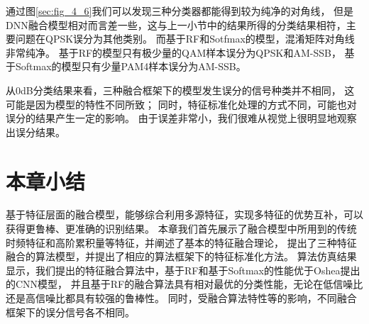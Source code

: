 通过图\ref{sec:fig_4_6}我们可以发现三种分类器都能得到较为纯净的对角线，
但是DNN融合模型相对而言差一些，这与上一小节中的结果所得的分类结果相符，主要问题在QPSK误分为其他类别。
而基于RF和Sotfmax的模型，混淆矩阵对角线非常纯净。
基于RF的模型只有极少量的QAM样本误分为QPSK和AM-SSB，
基于Softmax的模型只有少量PAM4样本误分为AM-SSB。\par

从0dB分类结果来看，三种融合框架下的模型发生误分的信号种类并不相同，
这可能是因为模型的特性不同所致；
同时，特征标准化处理的方式不同，可能也对误分的结果产生一定的影响。
由于误差非常小，我们很难从视觉上很明显地观察出误分结果。

\section{本章小结}
基于特征层面的融合模型，能够综合利用多源特征，实现多特征的优势互补，可以获得更鲁棒、更准确的识别结果。
本章我们首先展示了融合模型中所用到的传统时频特征和高阶累积量等特征，并阐述了基本的特征融合理论，
提出了三种特征融合的算法模型，并提出了相应的算法框架下的特征标准化方法。
算法仿真结果显示，我们提出的特征融合算法中，基于RF和基于Softmax的性能优于Oshea提出的CNN模型，
并且基于RF的融合算法具有相对最优的分类性能，无论在低信噪比还是高信噪比都具有较强的鲁棒性。
同时，受融合算法特性等的影响，不同融合框架下的误分信号各不相同。
\par

